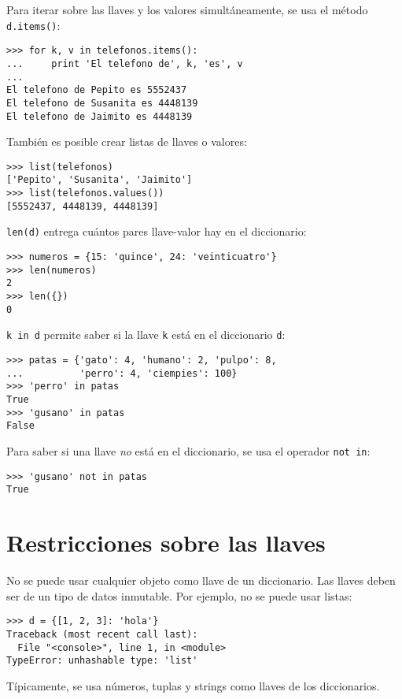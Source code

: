 Para iterar sobre las llaves y los valores simultáneamente, se usa el
método \lstinline!d.items()!:

\begin{lstlisting}
>>> for k, v in telefonos.items():
...     print 'El telefono de', k, 'es', v
...
El telefono de Pepito es 5552437
El telefono de Susanita es 4448139
El telefono de Jaimito es 4448139
\end{lstlisting}

También es posible crear listas de llaves o valores:

\begin{lstlisting}
>>> list(telefonos)
['Pepito', 'Susanita', 'Jaimito']
>>> list(telefonos.values())
[5552437, 4448139, 4448139]
\end{lstlisting}

\lstinline!len(d)! entrega cuántos pares llave-valor hay en el
diccionario:

\begin{lstlisting}
>>> numeros = {15: 'quince', 24: 'veinticuatro'}
>>> len(numeros)
2
>>> len({})
0
\end{lstlisting}

\lstinline!k in d! permite saber si la llave \lstinline!k! está en el
diccionario \lstinline!d!:

\begin{lstlisting}
>>> patas = {'gato': 4, 'humano': 2, 'pulpo': 8,
...          'perro': 4, 'ciempies': 100}
>>> 'perro' in patas
True
>>> 'gusano' in patas
False
\end{lstlisting}

Para saber si una llave \emph{no} está en el diccionario, se usa el
operador \lstinline!not in!:

\begin{lstlisting}
>>> 'gusano' not in patas
True
\end{lstlisting}

\section{Restricciones sobre las llaves}

No se puede usar cualquier objeto como llave de un diccionario. Las
llaves deben ser de un tipo de datos inmutable. Por ejemplo, no se puede
usar listas:

\begin{lstlisting}
>>> d = {[1, 2, 3]: 'hola'}
Traceback (most recent call last):
  File "<console>", line 1, in <module>
TypeError: unhashable type: 'list'
\end{lstlisting}

Típicamente, se usa números, tuplas y strings como llaves de los
diccionarios.
